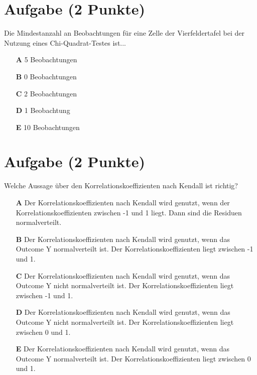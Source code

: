 \documentclass[a4paper, 10pt]{scrartcl}\usepackage[]{graphicx}\usepackage[]{xcolor}
\begin{document}
\section{Aufgabe \hfill (2 Punkte)}

Die Mindestanzahl an Beobachtungen f{\"u}r eine Zelle der Vierfeldertafel bei
der Nutzung eines Chi-Quadrat-Testes ist...



\begin{enumerate}
\item [\textbf{A} \msquare] 5 Beobachtungen
\item [\textbf{B} \msquare] 0 Beobachtungen
\item [\textbf{C} \msquare] 2 Beobachtungen
\item [\textbf{D} \msquare] 1 Beobachtung
\item [\textbf{E} \msquare] 10 Beobachtungen
\end{enumerate} 

\section{Aufgabe \hfill (2 Punkte)}




Welche Aussage {\"u}ber den Korrelationskoeffizienten nach Kendall
ist richtig?



\begin{enumerate}
\item [\textbf{A} \msquare] Der Korrelationskoeffizienten nach Kendall wird genutzt, wenn der Korrelationskoeffizienten zwischen -1 und 1 liegt. Dann sind die Residuen normalverteilt.
\item [\textbf{B} \msquare] Der Korrelationskoeffizienten nach Kendall wird genutzt, wenn das Outcome Y normalverteilt ist. Der Korrelationskoeffizienten liegt zwischen -1 und 1.
\item [\textbf{C} \msquare] Der Korrelationskoeffizienten nach Kendall wird genutzt, wenn das Outcome Y nicht normalverteilt ist. Der Korrelationskoeffizienten liegt zwischen -1 und 1.
\item [\textbf{D} \msquare] Der Korrelationskoeffizienten nach Kendall wird genutzt, wenn das Outcome Y nicht normalverteilt ist. Der Korrelationskoeffizienten liegt zwischen 0 und 1.
\item [\textbf{E} \msquare] Der Korrelationskoeffizienten nach Kendall wird genutzt, wenn das Outcome Y normalverteilt ist. Der Korrelationskoeffizienten liegt zwischen 0 und 1.
\end{enumerate} 
\end{document}
